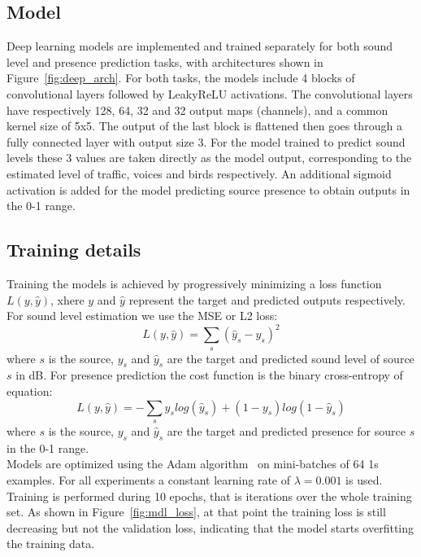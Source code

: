 \documentclass[11pt,a4paper]{article}
\begin{document}
\subsection{Model}

Deep learning models are implemented and trained separately for both sound level and presence prediction tasks, with architectures shown in Figure~\ref{fig:deep_arch}. For both tasks, the models include 4 blocks of convolutional layers followed by LeakyReLU activations. The convolutional layers have respectively 128, 64, 32 and 32 output maps (channels), and a common kernel size of 5x5. The output of the last block is flattened then goes through a fully connected layer with output size 3. For the model trained to predict sound levels these 3 values are taken directly as the model output, corresponding to the estimated level of traffic, voices and birds respectively. An additional sigmoid activation is added for the model predicting source presence to obtain outputs in the 0-1 range.

\subsection{Training details}

Training the models is achieved by progressively minimizing a loss function $L(y, \hat y)$, xhere $y$ and $\hat y$ represent the target and predicted outputs respectively. For sound level estimation we use the MSE or L2 loss:
\begin{equation}
L(y, \hat y) = \sum_s \left(\hat y_s - y_s\right)^2
\end{equation}
where $s$ is the source, $y_s$ and $\hat y_s$ are the target and predicted sound level of source $s$ in dB. For presence prediction the cost function is the binary cross-entropy of equation:
\begin{equation}
L(y, \hat y) = -\sum_s y_s log\left(\hat y_s\right) + (1-y_s) log\left(1-\hat y_s\right)
\end{equation}
where $s$ is the source, $y_s$ and $\hat y_s$ are the target and predicted presence for source $s$ in the 0-1 range.\\

Models are optimized using the Adam algorithm~\cite{adam} on mini-batches of 64 1s examples. For all experiments a constant learning rate of $\lambda = 0.001$ is used. Training is performed during 10 epochs, that is iterations over the whole training set. As shown in Figure~\ref{fig:mdl_loss}, at that point the training loss is still decreasing but not the validation loss, indicating that the model starts overfitting the training data.
\end{document}
